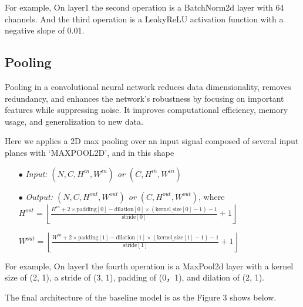 \documentclass{article}
\begin{document}
For example, On layer1 the second operation is a BatchNorm2d layer with 64 channels. And the third operation is a LeakyReLU activation function with a negative slope of 0.01.

\subsection{Pooling}

Pooling in a convolutional neural network reduces data dimensionality, removes redundancy, and enhances the network's robustness by focusing on important features while suppressing noise. It improves computational efficiency, memory usage, and generalization to new data.

Here we applies a 2D max pooling over an input signal composed of several input planes with ‘MAXPOOL2D’, and in this shape

\begin{itemize}
    \setlength\itemindent{2em}
    \item[$\bullet$] \emph{Input: $(N, C, H^{in}, W^{in})$ or $(C, H^{in}, W^{in})$}
    
    \item[$\bullet$] \emph{Output: $(N,C, H^{out}, W^{out})$ or $(C, H^{out}, W^{out})$}, where \\
    
    \emph{$H^{out} = \left\lfloor\frac{H^{in} + 2 \times \text{{padding}}[0] - \text{{dilation}}[0] \times (\text{{kernel\_size}}[0]-1)-1}{\text{{stride}}[0]} + 1 \right\rfloor$}
    
    \emph{$W^{out} = \left\lfloor\frac{W^{in} + 2 \times \text{{padding}}[1] - \text{{dilation}}[1] \times (\text{{kernel\_size}}[1]-1)-1}{\text{{stride}}[1]} + 1\right\rfloor$}
\end{itemize}

For example, On layer1 the fourth operation is a MaxPool2d layer with a kernel size of (2, 1), a stride of (3, 1), padding of (0，1), and dilation of (2, 1).

The final architecture of the baseline model is as the Figure 3 shows below.
\end{document}
